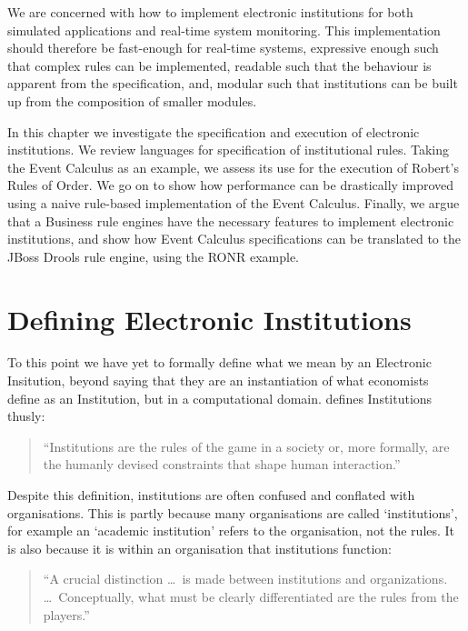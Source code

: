 We are concerned with how to implement electronic institutions for both
simulated applications and real-time system monitoring. This implementation
should therefore be fast-enough for real-time systems, expressive enough such
that complex rules can be implemented, readable such that the behaviour is
apparent from the specification, and, modular such that institutions can be
built up from the composition of smaller modules.

In this chapter we investigate the specification and execution of electronic
institutions. We review languages for specification of institutional rules.
Taking the Event Calculus as an example, we assess its use for the execution of
Robert's Rules of Order. We go on to show how performance can be drastically
improved using a naive rule-based implementation of the Event Calculus. Finally,
we argue that a Business rule engines have the necessary features to implement
electronic institutions, and show how Event Calculus specifications can be
translated to the JBoss Drools rule engine, using the \ac{RONR} example. 


\section{Defining Electronic Institutions}

To this point we have yet to formally define what we mean by an Electronic
Insitution, beyond saying that they are an instantiation of what economists
define as an Institution, but in a computational domain. \citet{North1990}
defines Institutions thusly: 

\begin{quote}
``Institutions are the rules of the
game in a society or, more formally, are the humanly devised constraints that
shape human interaction.''~\citep[p.3]{North1990}
\end{quote}

Despite this definition, institutions are often confused and conflated with
organisations. This is partly because many organisations are called
`institutions', for example an `academic institution' refers to the
organisation, not the rules. It is also because it is within an organisation
that institutions function:

\begin{quote}
``A crucial distinction \ldots\ is made between institutions and organizations.
\ldots\ Conceptually, what must be clearly differentiated are the rules from the
players.''~\citep[p.4]{North1990}
\end{quote}


